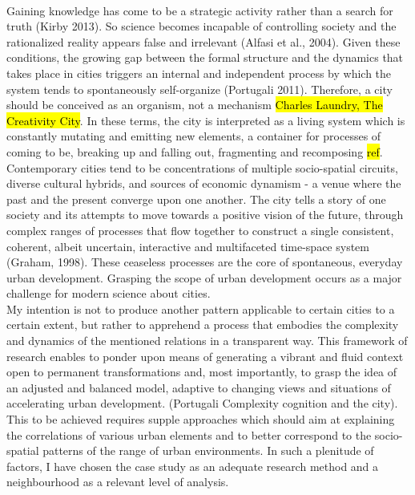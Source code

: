 \documentclass[11pt]{report}
\begin{document}
\\
Gaining knowledge has come to be a strategic activity rather than a search for truth (Kirby 2013). So science becomes incapable of controlling society and the rationalized reality appears false and irrelevant (Alfasi et al., 2004). Given these conditions, the growing gap between the formal structure and the dynamics that takes place in cities triggers an internal and independent process by which the system tends to spontaneously self-organize (Portugali 2011). Therefore, a city should be conceived as an organism, not a mechanism \hl{Charles Laundry, The Creativity City}. In these terms, the city is interpreted as a living system which is constantly mutating and emitting new elements, a container for processes of coming to be, breaking up and falling out, fragmenting and recomposing \hl{ref}. Contemporary cities tend to be concentrations of multiple socio-spatial circuits, diverse cultural hybrids, and sources of economic dynamism - a venue where the past and the present converge upon one another. The city tells a story of one society and its attempts to move towards a positive vision of the future, through complex ranges of processes that flow together to construct a single consistent, coherent, albeit uncertain, interactive and multifaceted time-space system (Graham, 1998). These ceaseless processes are the core of spontaneous, everyday urban development. Grasping the scope of urban development occurs as a major challenge for modern science about cities.
\\
My intention is not to produce another pattern applicable to certain cities to a certain extent, but rather to apprehend a process that embodies the complexity and dynamics of the mentioned relations in a transparent way.  This framework of research enables to ponder upon means of generating a vibrant and fluid context open to permanent transformations and, most importantly, to grasp the idea of an adjusted and balanced model, adaptive to changing views and situations of accelerating urban development. (Portugali Complexity cognition and the city). This to be achieved requires supple approaches which should aim at explaining the correlations of various urban elements and to better correspond to the socio-spatial patterns of the range of urban environments. In such a plenitude of factors, I have chosen the case study as an adequate research method and a neighbourhood as a relevant level of analysis.
\\
\end{document}

